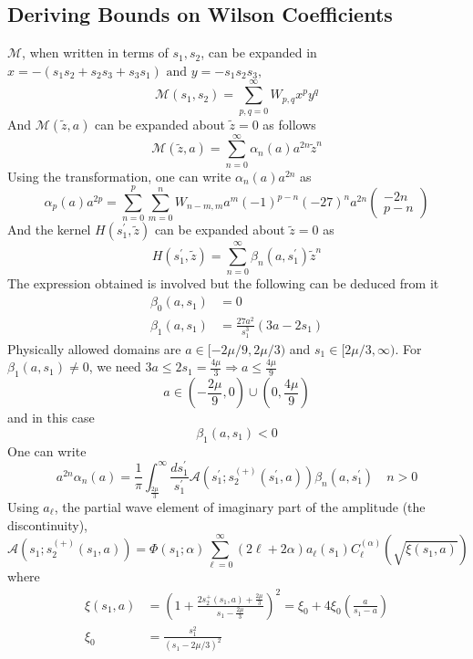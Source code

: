 ﻿\documentclass[12pt,a4paper]{article}
\begin{document}
\subsection{Deriving Bounds on Wilson Coefficients}
$\mathcal{M}$, when written in terms of $s_{1}, s_{2}$, can be expanded in  $x=-\left( s_{1} s_{2} + s_{2} s_{3} + s_{3} s_{1} \right) \text{ and } y=-s_{1} s_{2}s_{3},$
$$
\mathcal{M}\left(s_{1}, s_{2}\right)=\sum_{p,q=0}^{\infty} W_{p, q} x^{p} y^{q}
$$
And $\mathcal{M}(\tilde{z}, a)$ can be expanded about $\tilde z=0$ as follows
$$
\mathcal{M}(\tilde{z}, a)=\sum_{n=0}^{\infty} \alpha_{n}(a) a^{2 n} \tilde{z}^{n}
$$
Using the transformation, one can write $\alpha_{n}(a) a^{2 n}$ as
$$
\alpha_{p}(a) a^{2 p}=\sum_{n=0}^{p} \sum_{m=0}^{n} W_{n-m, m} a^{m}(-1)^{p-n}(-27)^{n} a^{2 n}\left(\begin{array}{c}
-2 n \\
p-n
\end{array}\right)
$$
And the kernel $H\left(s_{1}^{\prime}, \tilde{z}\right)$ can be expanded about $\tilde z=0$ as
$$
H\left(s_{1}^{\prime}, \tilde{z}\right)=\sum_{n=0}^{\infty} \beta_{n}\left(a, s_{1}^{\prime}\right) \tilde{z}^{n}
$$
The expression obtained \cite{10} is involved but the following can be deduced from it
$$
\begin{aligned}
\beta_{0}\left(a, s_{1}\right)&=0\\
\beta_{1}\left(a, s_{1}\right)&=\frac{27 a^{2}}{s_{1}^{3}}\left(3 a-2 s_{1}\right)
\end{aligned}
$$
Physically allowed domains are $a\in [-2 \mu / 9,2 \mu / 3)$ and $s_{1} \in [2 \mu / 3, \infty)$. For $\beta_{1}\left(a, s_{1}\right) \neq 0$, we need $3a\leq 2s_{1}=\frac{4\mu}{3} \Rightarrow a\leq \frac{4\mu}{9}$
$$
a \in\left(-\frac{2 \mu}{9}, 0\right) \cup\left(0, \frac{4 \mu}{9}\right) 
$$
and in this case
$$
\beta_{1}\left(a, s_{1}\right)<0
$$
One can write
$$
a^{2 n} \alpha_{n}(a)=\frac{1}{\pi} \int_{\frac{2 \mu}{3}}^{\infty} \frac{d s_{1}^{\prime}}{s_{1}^{\prime}} \mathcal{A}\left(s_{1}^{\prime} ; s_{2}^{(+)}\left(s_{1}^{\prime}, a\right)\right) \beta_{n}\left(a, s_{1}^{\prime}\right) \quad n>0
$$
Using $a_{\ell}$, the partial wave element of imaginary part of the amplitude (the discontinuity), 
$$
\mathcal{A}\left(s_{1} ; s_{2}^{(+)}\left(s_{1}, a\right)\right) =\Phi\left(s_{1} ; \alpha\right) \sum_{\ell=0}^{\infty}(2 \ell+2 \alpha) a_{\ell}\left(s_{1}\right) C_{\ell}^{(\alpha)}\left(\sqrt{\xi\left(s_{1}, a\right)}\right) 
$$
where
$$
\begin{aligned}
\xi\left(s_{1}, a\right) &=\left(1+\frac{2 s_{2}^{+}\left(s_{1}, a\right)+\frac{2 \mu}{3}}{s_{1}-\frac{2 \mu}{3}}\right)^{2}=\xi_{0}+4 \xi_{0}\left(\frac{a}{s_{1}-a}\right)\\
\xi_{0}&=\frac{s_{1}^{2}}{\left(s_{1}-2 \mu / 3\right)^{2}}
\end{aligned}
$$
\end{document}
